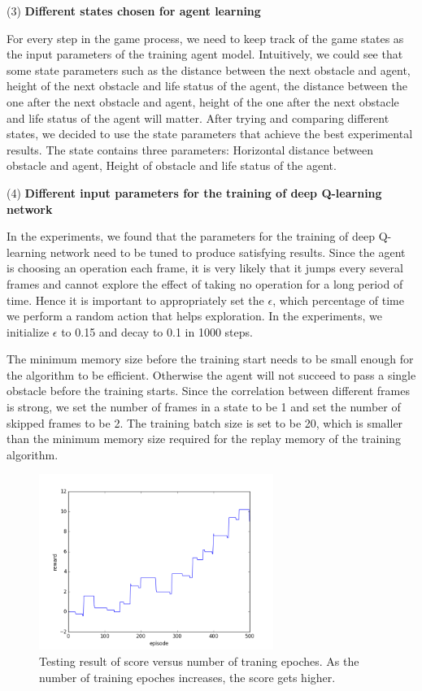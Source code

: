 \documentclass{acmsiggraph}
\begin{document}
(3) \textbf{Different states chosen for agent learning}

For every step in the game process, we need to keep track of the game states as the input parameters of the training agent model. Intuitively, we could see that some state parameters such as the distance between the next obstacle and agent, height of the next obstacle and life status of the agent, the distance between the one after the next obstacle and agent, height of the one after the next obstacle and life status of the agent will matter. After trying and comparing different states, we decided to use the state parameters that achieve the best experimental results. The state contains three parameters: Horizontal distance between obstacle and agent, Height of obstacle and life status of the agent.

(4) \textbf{Different input parameters for the training of deep Q-learning network}

In the experiments, we found that the parameters for the training of deep Q-learning network need to be tuned to produce satisfying results. Since the agent is choosing an operation each frame, it is very likely that it jumps every several frames and cannot explore the effect of taking no operation for a long period of time. Hence it is important to appropriately set the $\epsilon$, which percentage of time we perform a random action that helps exploration. In the experiments, we initialize $\epsilon$ to 0.15 and decay to 0.1 in 1000 steps.

The minimum memory size before the training start needs to be small enough for the algorithm to be efficient. Otherwise the agent will not succeed to pass a single obstacle before the training starts. Since the correlation between different frames is strong, we set the number of frames in a state to be 1 and set the number of skipped frames to be 2. The training batch size is set to be 20, which is smaller than the minimum memory size required for the replay memory of the training algorithm.


\begin{figure}[ht]
  \centering
  \includegraphics[width=3.0in]{../fig/reward_in_testing_20000.png}
  \caption{Testing result of score versus number of traning epoches. As the number of training epoches increases, the score gets higher.}
  \label{fig:result}
\end{figure}
\end{document}
